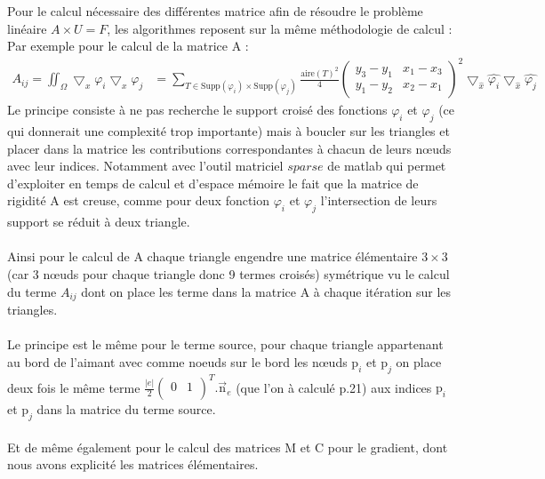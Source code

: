 \documentclass[a4paper,12pt,titlepage]{report}
\begin{document}
\begin{onehalfspace}
Pour le calcul nécessaire des différentes matrice afin de résoudre le problème linéaire $A\times U = F$, les algorithmes reposent sur la même méthodologie de calcul :
Par exemple pour le calcul de la matrice A : 
\[
\begin{aligned}
A_{ij} = 
	\iint_{\Omega}\bigtriangledown_{x}{\varphi_{i}} \bigtriangledown_{x}{\varphi_{j}} &= 
	\sum_{T \in \text{Supp}(\varphi_{i})\times \text{Supp}(\varphi_{j})}	
	\frac{\text{aire}(T)^{2}}{4}
	\begin{pmatrix}
   		y_{3}-y_{1} &  	x_{1}-x_{3}\\
   		y_{1}-y_{2} &  x_{2}-x_{1}
	\end{pmatrix}
	^{2}
	\bigtriangledown_{\hat{x}} \hat{\varphi_{i}}
	\bigtriangledown_{\hat{x}} \hat{\varphi_{j}}
\end{aligned}
\]
Le principe consiste à ne pas recherche le support croisé des fonctions $\varphi_i$ et $\varphi_j$ (ce qui donnerait une complexité trop importante) mais à boucler sur les triangles et placer dans la matrice les contributions correspondantes à chacun de leurs nœuds avec leur indices. Notamment avec l'outil matriciel $sparse$ de matlab qui permet d'exploiter en temps de calcul et d'espace mémoire le fait que la matrice de rigidité A est creuse, comme pour deux fonction $\varphi_{i}$ et $\varphi_{j}$ l'intersection de leurs support se réduit à deux triangle.
\\
\\
Ainsi pour le calcul de A chaque triangle engendre une matrice élémentaire $ 3\times 3$ (car 3 nœuds pour chaque triangle donc 9 termes croisés) symétrique vu le calcul du terme $A_{ij}$ dont on place les terme dans la matrice A à chaque itération sur les triangles.
\\
\\Le principe est le même pour le terme source, pour chaque triangle appartenant au bord de l'aimant avec comme noeuds sur le bord les nœuds $\text{p}_{i}$ et  $\text{p}_{j}$ on place deux fois le même terme $\frac{|e|}{2}\begin{pmatrix} 
   									0 & 1\\
								\end{pmatrix}^{T}.
								\vec{\text{n}}_{e}$ 
(que l'on à calculé p.21) aux indices $\text{p}_{i}$ et  $\text{p}_{j}$ dans la matrice du terme source.
\\
\\
Et de même également pour le calcul des matrices M et C pour le gradient, dont nous avons explicité les matrices élémentaires.	


\end{onehalfspace}
\end{document}
